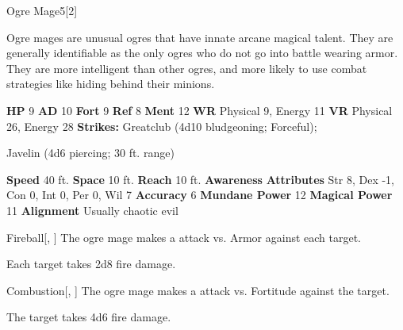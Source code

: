   \begin{monsubsection}{Ogre Mage}{5}[2]
    \vspace{-1em}\vspace{-1em}
    \vspace{0em}

    
          Ogre mages are unusual ogres that have innate arcane magical talent.
          They are generally identifiable as the only ogres who do not go into battle wearing armor.
          They are more intelligent than other ogres, and more likely to use combat strategies like hiding behind their minions.
        

    \begin{spellcontent}
      \begin{spelltargetinginfo}
        \pari \textbf{HP} 9 \monsep
          \textbf{AD} 10 \monsep
          \textbf{Fort} 9 \monsep
          \textbf{Ref} 8 \monsep
          \textbf{Ment} 12
        \pari \textbf{WR} Physical 9, Energy 11 \monsep
        \textbf{VR} Physical 26, Energy 28
        \pari \textbf{Strikes:}
            Greatclub  (4d10 bludgeoning; Forceful);
\par Javelin  (4d6 piercing; 30 ft. range)
      \end{spelltargetinginfo}
    \end{spellcontent}
    \begin{monsterfooter}
      \pari \textbf{Speed} 40 ft. \monsep
        \textbf{Space} 10 ft. \monsep
        \textbf{Reach} 10 ft.
      \pari \textbf{Awareness} 
      \pari \textbf{Attributes}
        Str 8, Dex -1,
        Con 0, Int 0,
        Per 0, Wil 7
      \pari \textbf{Accuracy} 6 \monsep
        \textbf{Mundane Power} 12 \monsep
      \textbf{Magical Power} 11
      \pari \textbf{Alignment} Usually chaotic evil
    \end{monsterfooter}
  \end{monsubsection}
  \begin{freeability}{Fireball}[, ]
       The ogre mage makes a  attack
        vs. Armor against each target.
    
    \hit Each target takes 2d8 fire damage.
    \end{freeability}
  

    \begin{freeability}{Combustion}[, ]
       The ogre mage makes a  attack
        vs. Fortitude against the target.
    
    \hit The target takes 4d6 fire damage.
    \end{freeability}
  

